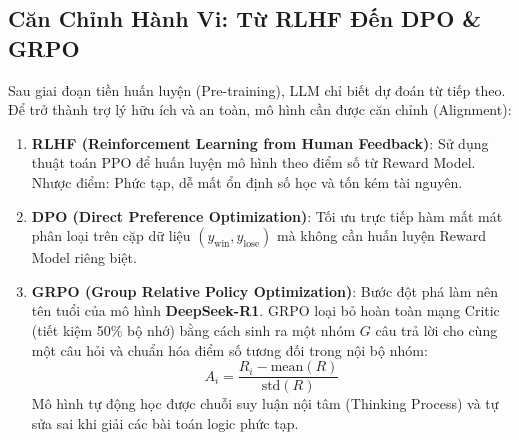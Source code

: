 \subsection{Căn Chỉnh Hành Vi: Từ RLHF Đến DPO \& GRPO}
Sau giai đoạn tiền huấn luyện (Pre-training), LLM chỉ biết dự đoán từ tiếp theo. Để trở thành trợ lý hữu ích và an toàn, mô hình cần được căn chỉnh (Alignment):
\begin{enumerate}
    \item \textbf{RLHF (Reinforcement Learning from Human Feedback)}: Sử dụng thuật toán PPO để huấn luyện mô hình theo điểm số từ Reward Model. Nhược điểm: Phức tạp, dễ mất ổn định số học và tốn kém tài nguyên.
    \item \textbf{DPO (Direct Preference Optimization)}: Tối ưu trực tiếp hàm mất mát phân loại trên cặp dữ liệu $(y_{\text{win}}, y_{\text{lose}})$ mà không cần huấn luyện Reward Model riêng biệt.
    \item \textbf{GRPO (Group Relative Policy Optimization)}: Bước đột phá làm nên tên tuổi của mô hình \textbf{DeepSeek-R1}. GRPO loại bỏ hoàn toàn mạng Critic (tiết kiệm 50\% bộ nhớ) bằng cách sinh ra một nhóm $G$ câu trả lời cho cùng một câu hỏi và chuẩn hóa điểm số tương đối trong nội bộ nhóm:
    \begin{equation}
    A_i = \frac{R_i - \text{mean}(R)}{\text{std}(R)}
    \end{equation}
    Mô hình tự động học được chuỗi suy luận nội tâm (Thinking Process) và tự sửa sai khi giải các bài toán logic phức tạp.
\end{enumerate}
